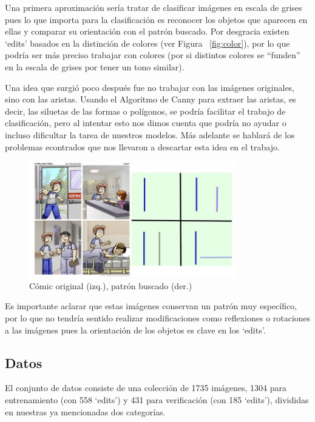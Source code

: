 \documentclass[spanish,11pt,letterpaper]{article}
\begin{document}
Una primera aproximación sería tratar de clasificar imágenes en escala de grises
pues lo que importa para la clasificación es reconocer los objetos que aparecen
en ellas y comparar su orientación con el patrón buscado. Por desgracia existen
`edits' basados en la distinción de colores (ver Figura ~\ref{fig:color}), por lo
que podría ser más preciso trabajar con colores (por si distintos colores se
``funden'' en la escala de grises por tener un tono similar).

Una idea que surgió poco después fue no trabajar con las imágenes originales, sino
con las aristas. Usando el Algoritmo de Canny para extraer las aristas, es decir,
las siluetas de las formas o polígonos, se podría facilitar el trabajo de
clasificación, pero al intentar esto nos dimos cuenta que podría no ayudar o
incluso dificultar la tarea de nuestros modelos. Más adelante se hablará de los problemas
econtrados que nos llevaron a descartar esta idea en el trabajo.

\begin{figure}[h]
\centering
\includegraphics[width=0.8\textwidth]{lossminimal}
\caption{Cómic original (izq.), patrón buscado (der.)}
\label{fig:loss}
\end{figure}

Es importante aclarar que estas imágenes conservan un patrón muy específico, por
lo que no tendría sentido realizar modificaciones como reflexiones o rotaciones
a las imágenes pues la orientación de los objetos es clave en los `edits'.

\subsection{Datos}

El conjunto de datos consiste de una colección de 1735 imágenes, 1304 para
entrenamiento (con 558 `edits') y 431 para verificación (con 185 `edits'), divididas
en nuestras ya mencionadas dos categorías.
\end{document}

